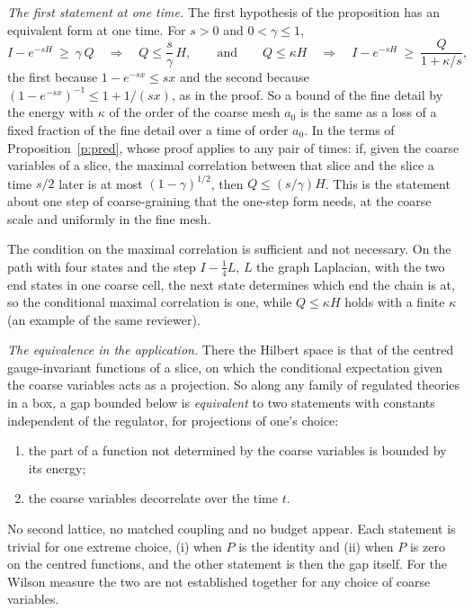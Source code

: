 \emph{The first statement at one time.} The first hypothesis of the proposition has an equivalent form at
one time. For $s>0$ and $0<\gamma\le1$,
\[
I-e^{-sH}\ \ge\ \gamma\,Q\quad\Longrightarrow\quad Q\le\frac s\gamma\,H,
\qquad\text{and}\qquad
Q\le\kappa H\quad\Longrightarrow\quad I-e^{-sH}\ \ge\ \frac{Q}{1+\kappa/s},
\]
the first because $1-e^{-sx}\le sx$ and the second because $(1-e^{-sx})^{-1}\le1+1/(sx)$, as in the proof. So
a bound of the fine detail by the energy with $\kappa$ of the order of the coarse mesh $a_0$ is the same as a
loss of a fixed fraction of the fine detail over a time of order $a_0$. In the terms of
Proposition~\ref{p:pred}, whose proof applies to any pair of times: if, given the coarse variables of a
slice, the maximal correlation between that slice and the slice a time $s/2$ later is at most
$(1-\gamma)^{1/2}$, then $Q\le(s/\gamma)H$. This is the statement about one step of coarse-graining that the
one-step form needs, at the coarse scale and uniformly in the fine mesh.

The condition on the maximal correlation is sufficient and not necessary. On the path with four states and
the step $I-\tfrac14L$, $L$ the graph Laplacian, with the two end states in one coarse cell, the next state
determines which end the chain is at, so the conditional maximal correlation is one, while $Q\le\kappa H$
holds with a finite $\kappa$ (an example of the same reviewer).

\emph{The equivalence in the application.} There the Hilbert space is that of the centred gauge-invariant
functions of a slice, on which the conditional expectation given the coarse variables acts as a projection.
So along any family of regulated theories in a box, a gap bounded below is \emph{equivalent} to two
statements with constants independent of the regulator, for projections of one's choice:
\begin{enumerate}
\item[(i)] the part of a function not determined by the coarse variables is bounded by its energy;
\item[(ii)] the coarse variables decorrelate over the time $t$.
\end{enumerate}
No second lattice, no matched coupling and no budget appear. Each statement is trivial for one extreme
choice, (i) when $P$ is the identity and (ii) when $P$ is zero on the centred functions, and the other
statement is then the gap itself. For the Wilson measure the two are not established together for any
choice of coarse variables.

